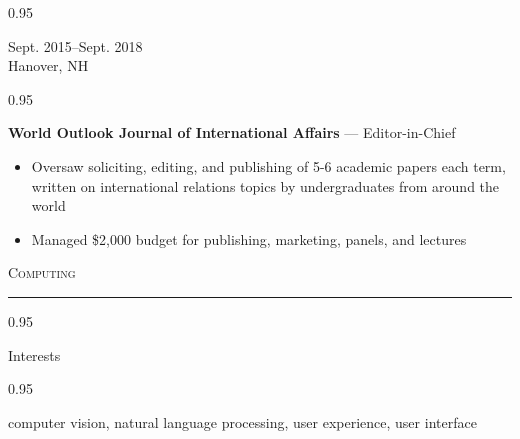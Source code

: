 \documentclass[a4paper,9pt]{article}
\newcommand{\mainMarginBottom}{\vspace*{1.5pt}}
\newcommand{\newLine}{\\}
\newcommand{\doubleColumnGap}{\hspace{4mm}}
\newcommand{\sectionMarginTopBottom}{\vspace*{7.5pt}}
\newcommand{\sectionMarginBetweenRemove}{\vspace{-5ex}}
\newcommand{\sectionMarginBetweenAdd}{\vspace{20pt}}
\newcommand{\mainLineSpacing}{0.95}
\begin{document}
\begin{minipage}[t]{0.20\linewidth}
	\begin{small}
		\begin{spacing}\mainLineSpacing{}
			\begin{flushright}
				Sept. 2015--Sept. 2018
				\newLine{}
				\mainMarginBottom{}
				Hanover, NH
			\end{flushright}
		\end{spacing}
	\end{small}
\end{minipage}
\doubleColumnGap{}
\begin{minipage}[t]{0.75\linewidth}
	\begin{small}
		\begin{spacing}\mainLineSpacing{}
			\begin{flushleft}
				\textbf{World Outlook Journal of International Affairs} --- Editor-in-Chief
				\mainMarginBottom{}
                \begin{itemize}[itemsep=0pt,topsep=0pt,leftmargin=*]
					\item Oversaw soliciting, editing, and publishing of 5-6 academic papers each term, written on international relations
topics by undergraduates from around the world
					\item Managed \$2,000 budget for publishing, marketing, panels, and lectures
				\end{itemize}
			\end{flushleft}
		\end{spacing}
	\end{small}
\end{minipage}

\sectionMarginBetweenRemove{}
\sectionMarginBetweenAdd{}

\begin{Large}
	\textsc{Computing}
\end{Large}
\sectionMarginTopBottom{}
\hrule
\sectionMarginTopBottom{}

\begin{minipage}[t]{0.20\linewidth}
	\begin{small}
		\begin{spacing}\mainLineSpacing{}
			\begin{flushright}
				Interests
			\end{flushright}
		\end{spacing}
	\end{small}
\end{minipage}
\doubleColumnGap{}
\begin{minipage}[t]{0.75\linewidth}
	\begin{small}
		\begin{spacing}\mainLineSpacing{}
			\begin{flushleft}
				computer vision, natural language processing, user experience, user interface
			\end{flushleft}
		\end{spacing}
	\end{small}
\end{minipage}
\end{document}
